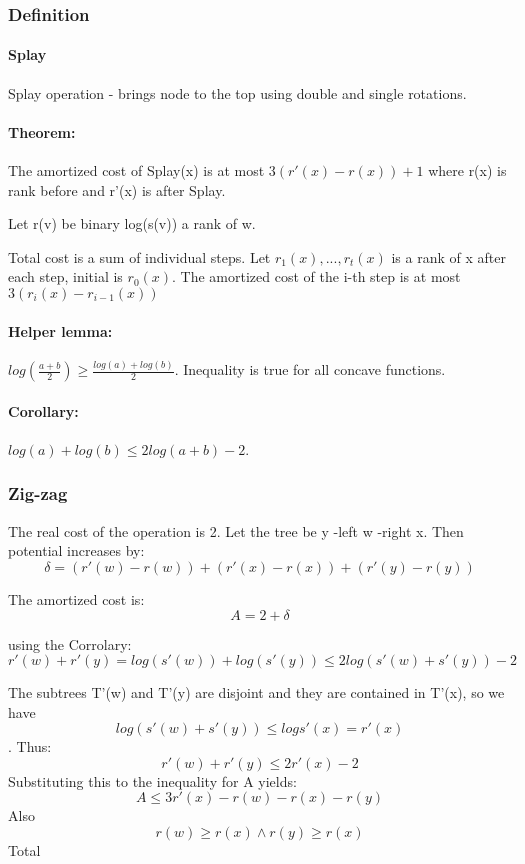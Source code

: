 \documentclass[12pt]{article}
\begin{document}
\subsubsection{Definition}

\paragraph{Splay}
Splay operation - brings node to the top using double and single rotations.

\paragraph{Theorem:} The amortized cost of Splay(x) is at most $ 3 (r'(x) - r(x)) + 1 $ where r(x) is rank before and r'(x) is after Splay.

Let r(v) be binary log(s(v)) a rank of w.

Total cost is a sum of individual steps. Let $ r_1(x), ..., r_t(x) $ is a rank of x after each step, initial is $ r_0(x) $.
The amortized cost of the i-th step is at most $ 3 (r_i(x) - r_{i-1}(x)) $

\paragraph{Helper lemma:}
$ log(\frac{a + b}{2}) \geq \frac{log(a) + log(b)}{2} $. Inequality is true for all concave functions.

\paragraph{Corollary:} $ log(a) + log(b) \leq 2log(a + b) - 2 $.

\subsubsection*{Zig-zag}
The real cost of the operation is 2. Let the tree be y -left w -right x. Then potential increases by:
\[ \delta = (r'(w) - r(w)) + (r'(x) - r(x)) + (r'(y) - r(y)) \]

The amortized cost is:
\[ A = 2 + \delta \]

using the Corrolary:
\[ r'(w) + r'(y) = log(s'(w)) + log(s'(y)) \leq 2log(s'(w) + s'(y)) - 2 \]

The subtrees T'(w) and T'(y) are disjoint and they are contained in T'(x), so we have
\[log(s'(w) + s'(y)) \leq log s'(x) = r'(x)\].
Thus:
\[ r'(w) + r'(y) \leq 2r'(x) - 2 \]
Substituting this to the inequality for A yields:
\[ A \leq 3r'(x) - r(w) - r(x) - r(y) \]
Also
\[ r(w) \geq r(x) \land r(y) \geq r(x) \]
Total
\end{document}
